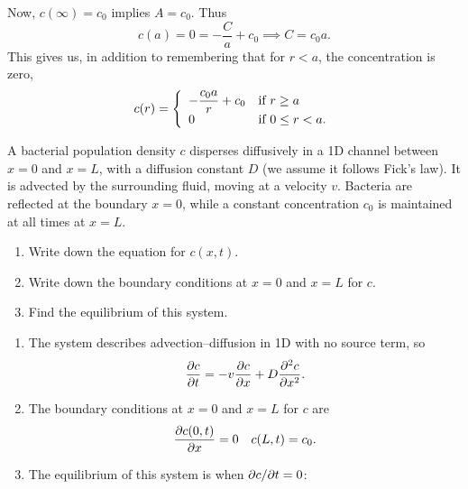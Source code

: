 \documentclass[a4paper, 12pt]{article}
\begin{document}
\begin{enumerate}[label={\bf \arabic{*}.\;}, ref={\arabic{*}},itemsep=3ex, left=0ex]
{\begin{enumerate}[label=(\alph*)]
{            Now, $c(\infty)= c_0$ implies $A=c_0$. Thus
            \begin{equation}
              c(a) = 0 = -\frac{C}{a} + c_0 \implies C = c_0a.
            \end{equation}
            This gives us, in addition to remembering that for $r < a$, the concentration is zero,
            \begin{equation}
              c(r) = \left\{ \begin{array}{ll} \displaystyle -\frac{c_0 a}{r} + c_0 & \mbox{if } r\geq a \\ 0 & \mbox{if } 0 \leq r < a. \end{array} \right.
            \end{equation}
          }
      \end{enumerate}
    }


    {
      A bacterial population density $c$ disperses diffusively in a 1D channel between $x=0$ and $x=L$, with a diffusion constant $D$ (we assume it follows Fick's law). It is advected by the surrounding fluid, moving at a velocity $v$. Bacteria are reflected at the boundary $x=0$, while a constant concentration $c_0$ is maintained at all times at $x=L$.
      \begin{enumerate}[label=(\alph*)]
        \item Write down the equation for $c(x,t)$.
        \item Write down the boundary conditions at $x=0$ and $x=L$ for $c$.
        \item Find the equilibrium of this system.
      \end{enumerate}
    }
    {
      \begin{enumerate}[label=(\alph*)]
        \item{The system describes advection--diffusion in 1D with no source term, so
            \begin{equation}
              \pd{c}{t} =-v\pd{c}{x} + D\pdd{c}{x}.
            \end{equation}
          }
        \item{The boundary conditions at $x=0$ and $x=L$ for $c$ are
            \begin{equation}
              \pd{c(0,t)}{x} = 0\quad  c(L,t) = c_0.
            \end{equation}
          }
        \item{The equilibrium of this system is when $\pd{c}{t}=0$:
            \begin{equation}

\end{equation}}
\end{enumerate}}
\end{enumerate}
\end{document}
